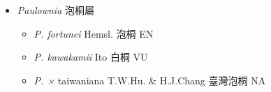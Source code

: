 
  \begin{itemize}
 \item[] \textit{Paulownia} 泡桐屬
                                
  \begin{itemize}
        \item[] \textit{P. fortunei} Hemsl.  泡桐   EN
        \item[] \textit{P. kawakamii} Ito  白桐   VU
        \item[] \textit{P. ×} taiwaniana \textit{} T.W.Hu. \& H.J.Chang  臺灣泡桐   NA
  \end{itemize}
  \end{itemize}
